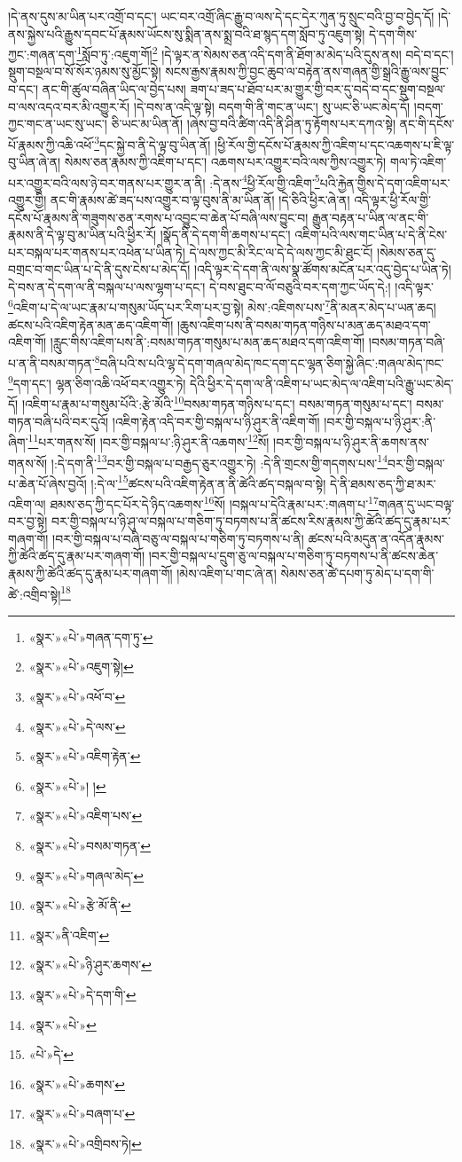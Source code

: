 །དེ་ནས་དུས་མ་ཡིན་པར་འགྲོ་བ་དང་། ཡང་བར་འགྲོ་ཞིང་རྒྱུ་བ་ལས་དེ་དང་དེར་ཀུན་ཏུ་སྲུང་བའི་བྱ་བ་བྱེད་དོ། །དེ་ནས་སྐྱེས་པའི་རྒྱུས་དབང་པོ་རྣམས་ཡོངས་སུ་སྨིན་ནས་སྨྲ་བའི་ཐ་སྙད་དག་སློབ་ཏུ་འཇུག་སྟེ། དེ་དག་གིས་ཀྱང་:གཞན་དག་\footnote{«སྣར་»«པེ་»གཞན་དག་ཏུ་}སློབ་ཏུ་:འཇུག་གོ།\footnote{«སྣར་»«པེ་»འཇུག་སྟེ།} །དེ་ལྟར་ན་སེམས་ཅན་འདི་དག་ནི་ཐོག་མ་མེད་པའི་དུས་ནས། བདེ་བ་དང་། སྡུག་བསྔལ་བ་སོ་སོར་ཉམས་སུ་མྱོང་སྟེ། སངས་རྒྱས་རྣམས་ཀྱི་བྱང་ཆུབ་ལ་བརྟེན་ནས་གཞན་གྱི་སྒྲའི་རྒྱུ་ལས་བྱུང་བ་དང་། ནང་གི་ཚུལ་བཞིན་ཡིད་ལ་བྱེད་པས། ཟག་པ་ཟད་པ་ཐོབ་པར་མ་གྱུར་གྱི་བར་དུ་བདེ་བ་དང་སྡུག་བསྔལ་བ་ལས་འདའ་བར་མི་འགྱུར་རོ། །དེ་བས་ན་འདི་ལྟ་སྟེ། བདག་གི་ནི་གང་ན་ཡང་། སུ་ཡང་ཅི་ཡང་མེད་དོ། །བདག་ཀྱང་གང་ན་ཡང་སུ་ཡང་། ཅི་ཡང་མ་ཡིན་ནོ། །ཞེས་བྱ་བའི་ཚིག་འདི་ནི་ཤིན་ཏུ་རྟོགས་པར་དཀའ་སྟེ། ནང་གི་དངོས་པོ་རྣམས་ཀྱི་འཆི་འཕོ་\footnote{«སྣར་»«པེ་»འཕོ་བ་}དང་སྐྱེ་བ་ནི་དེ་ལྟ་བུ་ཡིན་ནོ། །ཕྱི་རོལ་གྱི་དངོས་པོ་རྣམས་ཀྱི་འཇིག་པ་དང་འཆགས་པ་ཇི་ལྟ་བུ་ཡིན་ཞེ་ན། སེམས་ཅན་རྣམས་ཀྱི་འཇིག་པ་དང་། འཆགས་པར་འགྱུར་བའི་ལས་ཀྱིས་འགྱུར་ཏེ། གལ་ཏེ་འཇིག་པར་འགྱུར་བའི་ལས་ཉེ་བར་གནས་པར་གྱུར་ན་ནི། :དེ་ནས་\footnote{«སྣར་»«པེ་»དེ་ལས་}ཕྱི་རོལ་གྱི་འཇིག་\footnote{«སྣར་»«པེ་»འཇིག་རྟེན་}པའི་རྐྱེན་གྱིས་དེ་དག་འཇིག་པར་འགྱུར་གྱི། ནང་གི་རྣམས་ཚེ་ཟད་པས་འགྱུར་བ་ལྟ་བུས་ནི་མ་ཡིན་ནོ། །དེ་ཅིའི་ཕྱིར་ཞེ་ན། འདི་ལྟར་ཕྱི་རོལ་གྱི་དངོས་པོ་རྣམས་ནི་གཟུགས་ཅན་རགས་པ་འབྱུང་བ་ཆེན་པོ་བཞི་ལས་བྱུང་བ། རྒྱུན་བརྟན་པ་ཡིན་ལ་ནང་གི་རྣམས་ནི་དེ་ལྟ་བུ་མ་ཡིན་པའི་ཕྱིར་རོ། །སྣོད་ནི་དེ་དག་གི་ཆགས་པ་དང་། འཇིག་པའི་ལས་གང་ཡིན་པ་དེ་ནི་ངེས་པར་བསྐལ་པར་གནས་པར་འཕེན་པ་ཡིན་ཏེ། དེ་ལས་ཀྱང་མི་རིང་ལ་དེ་དེ་ལས་ཀྱང་མི་ཐུང་ངོ། །སེམས་ཅན་དུ་བགྲང་བ་གང་ཡིན་པ་དེ་ནི་དུས་ངེས་པ་མེད་དོ། །འདི་ལྟར་དེ་དག་ནི་ལས་སྣ་ཚོགས་མངོན་པར་འདུ་བྱེད་པ་ཡིན་ཏེ། དེ་བས་ན་དེ་དག་ལ་ནི་བསྐལ་པ་ལས་ལྷག་པ་དང་། དེ་བས་ཐུང་བ་ལོ་བཅུའི་བར་དག་ཀྱང་ཡོད་དེ:། །འདི་ལྟར་\footnote{«སྣར་»«པེ་»། །}འཇིག་པ་དེ་ལ་ཡང་རྣམ་པ་གསུམ་ཡོད་པར་རིག་པར་བྱ་སྟེ། མེས་:འཇིགས་པས་\footnote{«སྣར་»«པེ་»འཇིག་པས་}ནི་མནར་མེད་པ་ཡན་ཆད། ཚངས་པའི་འཇིག་རྟེན་མན་ཆད་འཇིག་གོ། །ཆུས་འཇིག་པས་ནི་བསམ་གཏན་གཉིས་པ་མན་ཆད་མཐའ་དག་འཇིག་གོ། །རླུང་གིས་འཇིག་པས་ནི་:བསམ་གཏན་གསུམ་པ་མན་ཆད་མཐའ་དག་འཇིག་གོ། །བསམ་གཏན་བཞི་པ་ན་ནི་བསམ་གཏན་\footnote{«སྣར་»«པེ་»བསམ་གཏན་}བཞི་པའི་ས་པའི་ལྷ་དེ་དག་གཞལ་མེད་ཁང་དག་དང་ལྷན་ཅིག་སྐྱེ་ཞིང་:གཞལ་མེད་ཁང་\footnote{«སྣར་»«པེ་»གཞལ་མེད་}དག་དང་། ལྷན་ཅིག་འཆི་འཕོ་བར་འགྱུར་ཏེ། དེའི་ཕྱིར་དེ་དག་ལ་ནི་འཇིག་པ་ཡང་མེད་ལ་འཇིག་པའི་རྒྱུ་ཡང་མེད་དོ། །འཇིག་པ་རྣམ་པ་གསུམ་པོའི་:རྩེ་མོའི་\footnote{«སྣར་»«པེ་»རྩེ་མོ་ནི་}བསམ་གཏན་གཉིས་པ་དང་། བསམ་གཏན་གསུམ་པ་དང་། བསམ་གཏན་བཞི་པའི་བར་དུའོ། །འཇིག་རྟེན་འདི་བར་གྱི་བསྐལ་པ་ཉི་ཤུར་ནི་འཇིག་གོ། །བར་གྱི་བསྐལ་པ་ཉི་ཤུར་:ནི་ཞིག་\footnote{«སྣར་»ནི་འཇིག་}པར་གནས་སོ། །བར་གྱི་བསྐལ་པ་:ཉི་ཤུར་ནི་འཆགས་\footnote{«སྣར་»«པེ་»ཉི་ཤུར་ཆགས་}སོ། །བར་གྱི་བསྐལ་པ་ཉི་ཤུར་ནི་ཆགས་ནས་གནས་སོ། །:དེ་དག་ནི་\footnote{«སྣར་»«པེ་»དེ་དག་གི་}བར་གྱི་བསྐལ་པ་བརྒྱད་ཅུར་འགྱུར་ཏེ། :དེ་ནི་གྲངས་གྱི་གདགས་པས་\footnote{«སྣར་»«པེ་»}བར་གྱི་བསྐལ་པ་ཆེན་པོ་ཞེས་བྱའོ། །:དེ་ལ་\footnote{«པེ་»དེ་}ཚངས་པའི་འཇིག་རྟེན་ན་ནི་ཚེའི་ཚད་བསྐལ་བ་སྟེ། དེ་ནི་ཐམས་ཅད་ཀྱི་ཐ་མར་འཇིག་ལ། ཐམས་ཅད་ཀྱི་དང་པོར་དེ་ཉིད་འཆགས་\footnote{«སྣར་»«པེ་»ཆགས་}སོ། །བསྐལ་པ་དེའི་རྣམ་པར་:གཞག་པ་\footnote{«སྣར་»«པེ་»བཞག་པ་}གཞན་དུ་ཡང་བལྟ་བར་བྱ་སྟེ། བར་གྱི་བསྐལ་པ་ཉི་ཤུ་ལ་བསྐལ་པ་གཅིག་ཏུ་བཏགས་པ་ནི་ཚངས་རིས་རྣམས་ཀྱི་ཚེའི་ཚད་དུ་རྣམ་པར་གཞག་གོ། །བར་གྱི་བསྐལ་པ་བཞི་བཅུ་ལ་བསྐལ་པ་གཅིག་ཏུ་བཏགས་པ་ནི། ཚངས་པའི་མདུན་ན་འདོན་རྣམས་ཀྱི་ཚེའི་ཚད་དུ་རྣམ་པར་གཞག་གོ། །བར་གྱི་བསྐལ་པ་དྲུག་ཅུ་ལ་བསྐལ་པ་གཅིག་ཏུ་བཏགས་པ་ནི་ཚངས་ཆེན་རྣམས་ཀྱི་ཚེའི་ཚད་དུ་རྣམ་པར་གཞག་གོ། །མེས་འཇིག་པ་གང་ཞེ་ན། སེམས་ཅན་ཚེ་དཔག་ཏུ་མེད་པ་དག་གི་ཚེ་:འགྲིབ་སྟེ།\footnote{«སྣར་»«པེ་»འགྲིབས་ཏེ།} 